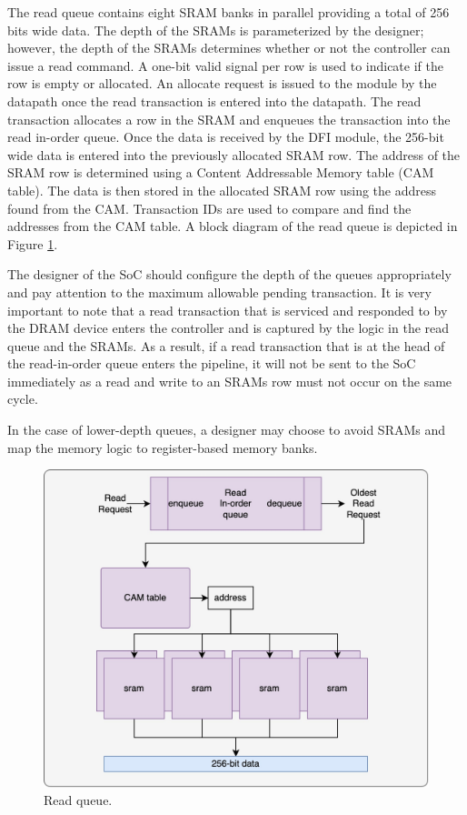 The read queue contains eight SRAM banks in parallel providing a total of 256 bits wide data. The depth of the SRAMs is parameterized by the designer; however, the depth of the SRAMs determines whether or not the controller can issue a read command. A one-bit valid signal per row is used to indicate if the row is empty or allocated. An allocate request is issued to the module by the datapath once the read transaction is entered into the datapath. The read transaction allocates a row in the SRAM and enqueues the transaction into the read in-order queue. Once the data is received by the DFI module, the 256-bit wide data is entered into the previously allocated SRAM row. The address of the SRAM row is determined using a Content Addressable Memory table (CAM table). The data is then stored in the allocated SRAM row using the address found from the CAM. Transaction IDs are used to compare and find the addresses from the CAM table. A block diagram of the read queue is depicted in Figure \ref{fig:reqdq}. 

The designer of the SoC should configure the depth of the queues appropriately and pay attention to the maximum allowable pending transaction. It is very important to note that a read transaction that is serviced and responded to by the DRAM device enters the controller and is captured by the logic in the read queue and the SRAMs. As a result, if a read transaction that is at the head of the read-in-order queue enters the pipeline, it will not be sent to the SoC immediately as a read and write to an SRAMs row must not occur on the same cycle.

In the case of lower-depth queues, a designer may choose to avoid SRAMs and map the memory logic to register-based memory banks.
\begin{figure}[H]
    \centering
    \includegraphics[scale=0.2]{images/readQ.jpg}
    \caption{Read queue.}
    \label{fig:reqdq}
\end{figure}
